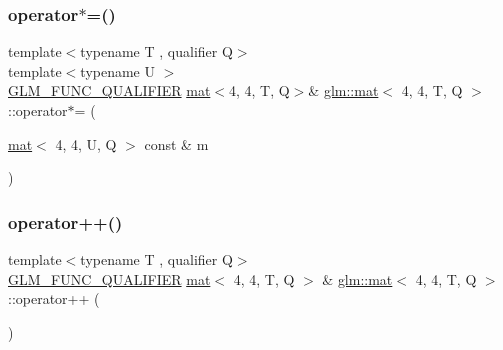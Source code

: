 \subsubsection{\texorpdfstring{operator$\ast$=()}{operator*=()}\hspace{0.1cm}{\footnotesize\ttfamily [4/4]}}
{\footnotesize\ttfamily template$<$typename T , qualifier Q$>$ \\
template$<$typename U $>$ \\
\mbox{\hyperlink{setup_8hpp_a33fdea6f91c5f834105f7415e2a64407}{G\+L\+M\+\_\+\+F\+U\+N\+C\+\_\+\+Q\+U\+A\+L\+I\+F\+I\+ER}} \mbox{\hyperlink{structglm_1_1mat}{mat}}$<$4, 4, T, Q$>$\& \mbox{\hyperlink{structglm_1_1mat}{glm\+::mat}}$<$ 4, 4, T, Q $>$\+::operator$\ast$= (\begin{DoxyParamCaption}\item[{\mbox{\hyperlink{structglm_1_1mat}{mat}}$<$ 4, 4, U, Q $>$ const \&}]{m }\end{DoxyParamCaption})}

\mbox{\label{structglm_1_1mat_3_014_00_014_00_01_t_00_01_q_01_4_a39435dc193ef8ac3a8c417651ae6440e}} 
\subsubsection{\texorpdfstring{operator++()}{operator++()}\hspace{0.1cm}{\footnotesize\ttfamily [1/2]}}
{\footnotesize\ttfamily template$<$typename T , qualifier Q$>$ \\
\mbox{\hyperlink{setup_8hpp_a33fdea6f91c5f834105f7415e2a64407}{G\+L\+M\+\_\+\+F\+U\+N\+C\+\_\+\+Q\+U\+A\+L\+I\+F\+I\+ER}} \mbox{\hyperlink{structglm_1_1mat}{mat}}$<$ 4, 4, T, Q $>$ \& \mbox{\hyperlink{structglm_1_1mat}{glm\+::mat}}$<$ 4, 4, T, Q $>$\+::operator++ (\begin{DoxyParamCaption}{ }\end{DoxyParamCaption})}

\mbox{\label{structglm_1_1mat_3_014_00_014_00_01_t_00_01_q_01_4_a63e4b9e5fd2328e10fe75fec5ab1a10b}} 
